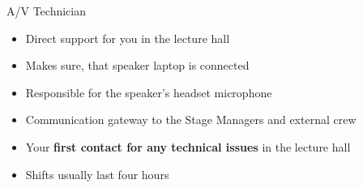 
\begin{frame}{A/V Technician}
	\begin{itemize}
		\item Direct support for you in the lecture hall
		\item Makes sure, that speaker laptop is connected
		\item Responsible for the speaker's headset microphone
		\item Communication gateway to the Stage Managers and external crew
		\item Your \textbf{first contact for any technical issues} in the lecture hall
		\item Shifts usually last four hours
	\end{itemize}
\end{frame}
